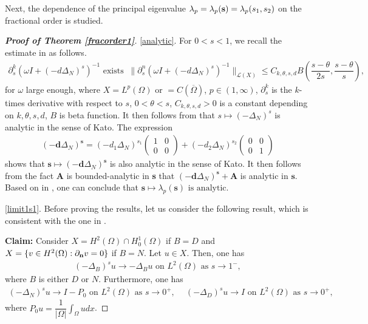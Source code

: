 \documentclass[a4paper,11pt]{amsart}
\theoremstyle{definition}
\def\O{\Omega}
\numberwithin{equation}{section}
\theoremstyle{definition}
\def\O{\Omega}
\begin{document}
Next, the dependence of the principal eigenvalue $\lambda_p=\lambda_p({\bf s})=\lambda_p(s_1,s_2)$ on the fractional order is studied.


\begin{proof}[\bf Proof of Theorem \ref{fracorder1}]

\ref{analytic}. For $0<s<1$, we recall the estimate in \cite[Theorem 3.1, Step 4]{zhao_spatiotemporal_2025} as follows.
\begin{align*}
\partial^k_s(\omega I+ (-d\Delta_N)^s)^{-1} \text{ exists }~\|\partial^n_s(\omega I+ (-d\Delta_N)^s)^{-1} \|_{\mathcal{L}(X)}\leq C_{k,\theta,s,d} B\left(\dfrac{s-\theta}{2s},\dfrac{s-\theta}{s}\right),
\end{align*}
for $\omega$ large enough, where $X=L^p(\O)$ or $=C(\overline{\O})$, $p\in (1,\infty)$, $\partial^k_s$ is the $k$-times derivative with respect to $s$, $0<\theta<s$, $C_{k,\theta,s,d}>0$ is a constant depending on $k,\theta,s,d$, $B$ is beta function. It then follows from \cite[Theorem 1.3.2]{kato_1976} that $s\mapsto (-\Delta_N)^s$ is analytic in the sense of Kato. The expression
\begin{align*}
(-\textbf{d}\Delta_N)^{\textbf{s}}=(-d_1\Delta_N)^{s_1}\begin{pmatrix}
1&0\\
0&0
\end{pmatrix}
+ (-d_2\Delta_N)^{s_2}\begin{pmatrix}
0&0\\
0&1
\end{pmatrix}
\end{align*}
shows that $\textbf{s}\mapsto(-\textbf{d}\Delta_N)^{\textbf{s}} $ is also analytic in the sense of Kato. It then follows from the fact $\textbf{A}$ is bounded-analytic in \textbf{s} that $(-\textbf{d}\Delta_N)^{\textbf{s}}+ \textbf{A}$ is analytic in $\textbf{s}$. Based on in \cite[Chapter 7, Theorem 1.8]{kato_1976}, one can conclude that $\textbf{s}\mapsto \lambda_p(\textbf{s}) \text{ is analytic.}$

\ref{limit1s1}. Before proving the results, let us consider the following result, which is consistent with the one in \cite[Proposition 4.4]{di_hitchhiker_2012}.

\phantom{1}

\textbf{Claim:}
Consider  $X=H^2(\O)\cap H^1_0(\O)$ if $B=D$ and $X=\{v\in H^2(\O):\partial_{\bf n}v=0\}$ if $B=N$. Let  $u\in X$. Then, one has
\begin{align*}
(-\Delta_B)^s u \rightarrow -\Delta_B u \text{ on }L^2(\O) \text{ as }s\rightarrow 1^-,
\end{align*}
where $B$ is either $D$ or $N$. Furthermore, one has
\begin{align*}
(-\Delta_N)^s u \rightarrow I-P_0 \text{ on }L^2(\O) \text{ as }s\rightarrow 0^+,\quad~(-\Delta_D)^s u \rightarrow I \text{ on }L^2(\O) \text{ as }s\rightarrow 0^+,
\end{align*}
where $P_0u=\dfrac{1}{|\O|}\displaystyle\int_\O udx$.


\end{proof}
\end{document}
